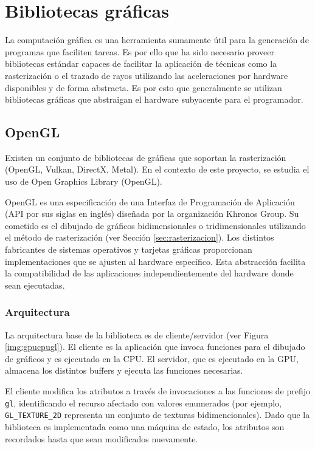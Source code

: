 \section{Bibliotecas gráficas}

La computación gráfica es una herramienta sumamente útil para la generación de programas que faciliten tareas. Es por ello que ha sido necesario proveer bibliotecas estándar capaces de facilitar la aplicación de técnicas como la rasterización o el trazado de rayos utilizando las aceleraciones por hardware disponibles y de forma abstracta. Es por esto que generalmente se utilizan bibliotecas gráficas que abstraigan el hardware subyacente para el programador.

\subsection{OpenGL}

Existen un conjunto de bibliotecas de gráficas que soportan la rasterización (OpenGL, Vulkan, DirectX, Metal). En el contexto de este proyecto, se estudia el uso de Open Graphics Library (OpenGL).

OpenGL es una especificación de una Interfaz de Programación de Aplicación (API por sus siglas en inglés) diseñada por la organización Khronos Group. Su cometido es el dibujado de gráficos bidimensionales o tridimensionales utilizando el método de rasterización (ver Sección \ref{sec:rasterizacion}). Los distintos fabricantes de sistemas operativos y tarjetas gráficas proporcionan implementaciones que se ajusten al hardware específico. Esta abstracción facilita la compatibilidad de las aplicaciones independientemente del hardware donde sean ejecutadas.

\subsubsection{Arquitectura}
La arquitectura base de la biblioteca es de cliente/servidor (ver Figura \ref{img:gpucpugl}). El cliente es la aplicación que invoca funciones para el dibujado de gráficos y es ejecutado en la CPU. El servidor, que es ejecutado en la GPU, almacena los distintos buffers y ejecuta las funciones necesarias.

El cliente modifica los atributos a través de invocaciones a las funciones de prefijo \verb|gl|, identificando el recurso afectado con valores enumerados (por ejemplo, \verb|GL_TEXTURE_2D| representa un conjunto de texturas bidimencionales). Dado que la biblioteca es implementada como una máquina de estado, los atributos son recordados hasta que sean modificados nuevamente.

